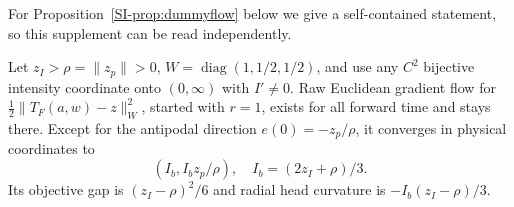 For Proposition~\ref{SI-prop:dummyflow} below we give a self-contained statement, so this supplement can be read independently.
\begin{proposition}
\label{SI-prop:dummyflow}
Let $z_I>\rho=\|z_p\|>0$, $W=\operatorname{diag}(1,1/2,1/2)$, and use any $C^2$ bijective intensity coordinate onto $(0,\infty)$ with $I'\ne0$. Raw Euclidean gradient flow for $\tfrac12\|T_F(a,w)-z\|_W^2$, started with $r=1$, exists for all forward time and stays there. Except for the antipodal direction $e(0)=-z_p/\rho$, it converges in physical coordinates to
\begin{equation}
 (I_b,I_b z_p/\rho),\quad I_b=(2z_I+\rho)/3.
\end{equation}
Its objective gap is $(z_I-\rho)^2/6$ and radial head curvature is $-I_b(z_I-\rho)/3$.
\end{proposition}
